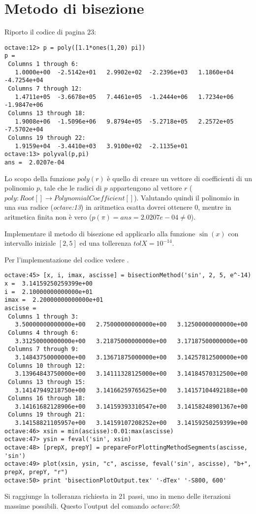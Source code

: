 \section{Metodo di bisezione}
\label{sec:metodoDiBisezione}
Riporto il codice di pagina 23:
\begin{lstlisting}
octave:12> p = poly([1.1*ones(1,20) pi])
p =
 Columns 1 through 6:
   1.0000e+00  -2.5142e+01   2.9902e+02  -2.2396e+03   1.1860e+04  -4.7254e+04
 Columns 7 through 12:
   1.4711e+05  -3.6678e+05   7.4461e+05  -1.2444e+06   1.7234e+06  -1.9847e+06
 Columns 13 through 18:
   1.9008e+06  -1.5096e+06   9.8794e+05  -5.2718e+05   2.2572e+05  -7.5702e+04
 Columns 19 through 22:
   1.9159e+04  -3.4410e+03   3.9100e+02  -2.1135e+01
octave:13> polyval(p,pi)
ans =  2.0207e-04
\end{lstlisting}
Lo scopo della funzione $poly(r)$ \`e quello di creare un vettore di coefficienti
di un polinomio $p$, tale che le radici di $p$ appartengono al vettore $r$ 
($poly: Root[] \rightarrow PolynomialCoefficient[]$).
Valutando quindi il polinomio in una sua radice (\emph{octave:13}) in aritmetica
esatta dovrei ottenere 0, mentre in aritmetica finita non \`e vero 
($p(\pi) = ans =  2.0207e-04 \not = 0$).

\begin{exercise}
Implementare il metodo di bisezione ed applicarlo alla funzione $\sin(x)$ 
con intervallo iniziale $[2, 5]$ ed una tollerenza $tolX = 10^{-14}$.
\end{exercise}
Per l'implementazione del codice vedere .
\begin{lstlisting}
octave:45> [x, i, imax, ascisse] = bisectionMethod('sin', 2, 5, e^-14)
x =  3.14159250259399e+00
i =  2.10000000000000e+01
imax =  2.20000000000000e+01
ascisse =
 Columns 1 through 3:
   3.50000000000000e+00   2.75000000000000e+00   3.12500000000000e+00
 Columns 4 through 6:
   3.31250000000000e+00   3.21875000000000e+00   3.17187500000000e+00
 Columns 7 through 9:
   3.14843750000000e+00   3.13671875000000e+00   3.14257812500000e+00
 Columns 10 through 12:
   3.13964843750000e+00   3.14111328125000e+00   3.14184570312500e+00
 Columns 13 through 15:
   3.14147949218750e+00   3.14166259765625e+00   3.14157104492188e+00
 Columns 16 through 18:
   3.14161682128906e+00   3.14159393310547e+00   3.14158248901367e+00
 Columns 19 through 21:
   3.14158821105957e+00   3.14159107208252e+00   3.14159250259399e+00
octave:46> xsin = min(ascisse):0.01:max(ascisse)
octave:47> ysin = feval('sin', xsin)
octave:48> [prepX, prepY] = prepareForPlottingMethodSegments(ascisse, 'sin')
octave:49> plot(xsin, ysin, "c", ascisse, feval('sin', ascisse), "b+", prepX, prepY, "r")
octave:50> print 'bisectionPlotOutput.tex' '-dTex' '-S800, 600'
\end{lstlisting}
Si raggiunge la tolleranza richiesta in 21 passi, uno in meno delle iterazioni
massime possibili. Questo l'output del comando \emph{octave:50}:
\begin{center}

\end{center}

